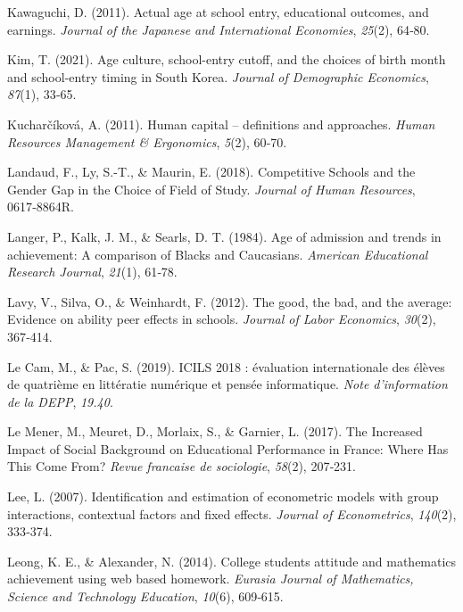 \documentclass[
]{book}
\newlength{\cslhangindent}
\newlength{\cslentryspacingunit} %
\newenvironment{CSLReferences}[2] %
 {%
  \setlength{\parindent}{0pt}
  \ifodd #1
  \let\oldpar\par
  \def\par{\hangindent=\cslhangindent\oldpar}
  \fi
  \setlength{\parskip}{#2\cslentryspacingunit}
 }%
 {}
\begin{document}
\begin{CSLReferences}{1}{2}
\leavevmode{}%
Kawaguchi, D. (2011). Actual age at school entry, educational outcomes, and earnings. \emph{Journal of the Japanese and International Economies}, \emph{25}(2), 64‑80.

\leavevmode{}%
Kim, T. (2021). Age culture, school-entry cutoff, and the choices of birth month and school-entry timing in South Korea. \emph{Journal of Demographic Economics}, \emph{87}(1), 33‑65.

\leavevmode{}%
Kucharčíková, A. (2011). Human capital -- definitions and approaches. \emph{Human Resources Management \& Ergonomics}, \emph{5}(2), 60‑70.

\leavevmode{}%
Landaud, F., Ly, S.-T., \& Maurin, E. (2018). Competitive Schools and the Gender Gap in the Choice of Field of Study. \emph{Journal of Human Resources}, 0617‑8864R.

\leavevmode{}%
Langer, P., Kalk, J. M., \& Searls, D. T. (1984). Age of admission and trends in achievement: A comparison of Blacks and Caucasians. \emph{American Educational Research Journal}, \emph{21}(1), 61‑78.

\leavevmode{}%
Lavy, V., Silva, O., \& Weinhardt, F. (2012). The good, the bad, and the average: Evidence on ability peer effects in schools. \emph{Journal of Labor Economics}, \emph{30}(2), 367‑414.

\leavevmode{}%
Le Cam, M., \& Pac, S. (2019). ICILS 2018 : évaluation internationale des élèves de quatrième en littératie numérique et pensée informatique. \emph{Note d'information de la DEPP}, \emph{19.40}.

\leavevmode{}%
Le Mener, M., Meuret, D., Morlaix, S., \& Garnier, L. (2017). The Increased Impact of Social Background on Educational Performance in France: Where Has This Come From? \emph{Revue francaise de sociologie}, \emph{58}(2), 207‑231.

\leavevmode{}%
Lee, L. (2007). Identification and estimation of econometric models with group interactions, contextual factors and fixed effects. \emph{Journal of Econometrics}, \emph{140}(2), 333‑374.

\leavevmode{}%
Leong, K. E., \& Alexander, N. (2014). College students attitude and mathematics achievement using web based homework. \emph{Eurasia Journal of Mathematics, Science and Technology Education}, \emph{10}(6), 609‑615.


\end{CSLReferences}
\end{document}
